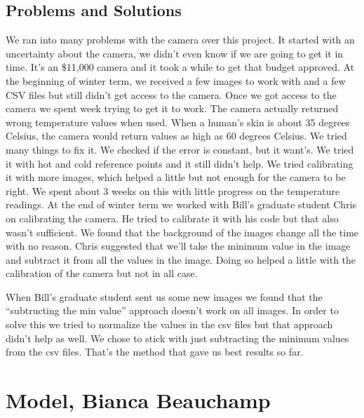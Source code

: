 \documentclass[onecolumn, draftclsnofoot,10pt, compsoc]{IEEEtran}
\begin{document}
\subsection{Problems and Solutions}
We ran into many problems with the camera over this project. It started with an uncertainty about the camera, we didn’t even know if we are going to get it in time. It’s an \$11,000 camera and it took a while to get that budget approved. At the beginning of winter term, we received a few images to work with and a few CSV files but still didn’t get access to the camera. Once we got access to the camera we spent week trying to get it to work. The camera actually returned wrong temperature values when used. When a human’s skin is about 35 degrees Celsius, the camera would return values as high as 60 degrees Celsius. We tried many things to fix it. We checked if the error is constant, but it want’s. We tried it with hot and cold reference points and it still didn’t help. We tried calibrating it with more images, which helped a little but not enough for the camera to be right. We spent about 3 weeks on this with little progress on the temperature readings. At the end of winter term we worked with Bill’s graduate student Chris on calibrating the camera. He tried to calibrate it with his code but that also wasn’t sufficient. We found that the background of the images change all the time with no reason. Chris suggested that we’ll take the minimum value in the image and subtract it from all the values in the image. Doing so helped a little with the calibration of the camera but not in all case. 

When Bill’s graduate student sent us some new images we found that the “subtructing the min value” approach doesn’t work on all images. In order to solve this we tried to normalize the values in the csv files but that approach didn’t help as well. We chose to stick with just subtracting the minimum values from the csv files. That’s the method that gave us best results so far.\cite{ClaudeTech}


\section{Model, Bianca Beauchamp}
\end{document}
